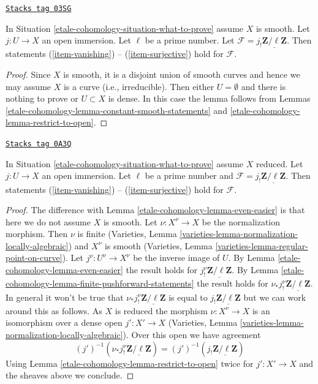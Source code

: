 \begin{lemma}
\label{etale-cohomology-lemma-even-easier}
\href{https://stacks.math.columbia.edu/tag/03SG}{\texttt{Stacks tag 03SG}}

In Situation \ref{etale-cohomology-situation-what-to-prove} assume $X$ is smooth.
Let $j : U \to X$ an open immersion. Let $\ell$ be a prime number.
Let $\mathcal{F} = j_!\underline{\mathbf{Z}/\ell\mathbf{Z}}$.
Then statements (\ref{item-vanishing}) -- (\ref{item-surjective}) hold
for $\mathcal{F}$.
\end{lemma}

\begin{proof}
Since $X$ is smooth, it is a disjoint union of smooth curves
and hence we may assume $X$ is a curve (i.e., irreducible).
Then either $U = \emptyset$ and there is nothing to prove
or $U \subset X$ is dense. In this case the lemma follows from
Lemmas \ref{etale-cohomology-lemma-constant-smooth-statements} and
\ref{etale-cohomology-lemma-restrict-to-open}.
\end{proof}

\begin{lemma}
\label{etale-cohomology-lemma-somewhat-easier}
\href{https://stacks.math.columbia.edu/tag/0A3Q}{\texttt{Stacks tag 0A3Q}}

In Situation \ref{etale-cohomology-situation-what-to-prove} assume $X$ reduced.
Let $j : U \to X$ an open immersion. Let $\ell$ be a prime number
and $\mathcal{F} = j_!\underline{\mathbf{Z}/\ell\mathbf{Z}}$.
Then statements (\ref{item-vanishing}) -- (\ref{item-surjective}) hold
for $\mathcal{F}$.
\end{lemma}

\begin{proof}
The difference with Lemma \ref{etale-cohomology-lemma-even-easier} is that here we do not
assume $X$ is smooth. Let $\nu : X^\nu \to X$ be the normalization
morphism. Then $\nu$ is finite
(Varieties, Lemma \ref{varieties-lemma-normalization-locally-algebraic})
and $X^\nu$ is smooth
(Varieties, Lemma \ref{varieties-lemma-regular-point-on-curve}).
Let $j^\nu : U^\nu \to X^\nu$ be the inverse image of $U$.
By Lemma \ref{etale-cohomology-lemma-even-easier} the result holds for
$j^\nu_!\underline{\mathbf{Z}/\ell\mathbf{Z}}$.
By Lemma \ref{etale-cohomology-lemma-finite-pushforward-statements}
the result holds for $\nu_*j^\nu_!\underline{\mathbf{Z}/\ell\mathbf{Z}}$.
In general it won't be true that
$\nu_*j^\nu_!\underline{\mathbf{Z}/\ell\mathbf{Z}}$ is equal to
$j_!\underline{\mathbf{Z}/\ell\mathbf{Z}}$
but we can work around this as follows.
As $X$ is reduced the morphism $\nu : X^\nu \to X$
is an isomorphism over a dense open $j' : X' \to X$
(Varieties, Lemma \ref{varieties-lemma-normalization-locally-algebraic}).
Over this open we have agreement
$$
(j')^{-1}(\nu_*j^\nu_!\underline{\mathbf{Z}/\ell\mathbf{Z}})
=
(j')^{-1}(j_!\underline{\mathbf{Z}/\ell\mathbf{Z}})
$$
Using Lemma \ref{etale-cohomology-lemma-restrict-to-open}
twice for $j' : X' \to X$ and the sheaves above
we conclude.
\end{proof}

